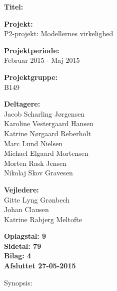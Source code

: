 \begin{minipage}[t]{0.48\textwidth}
\textbf{Titel:} \\[5pt]\bigskip\hspace{2ex}


\textbf{Projekt:} \\[5pt]\bigskip\hspace{2ex}
P2-projekt: Modellernes virkelighed

\textbf{Projektperiode:} \\[5pt]\bigskip\hspace{2ex}
Februar 2015 - Maj 2015

\textbf{Projektgruppe:} \\[5pt]\bigskip\hspace{2ex}
B149

\textbf{Deltagere:} \\[5pt]\hspace*{2ex}
Jacob Scharling Jørgensen \\\hspace*{2ex}
Karoline Vestergaard Hansen \\\hspace*{2ex}
Katrine Nørgaard Reberholt \\\hspace*{2ex}
Marc Lund Nielsen \\\hspace*{2ex}
Michael Elgaard Mortensen \\\hspace*{2ex}
Morten Rask Jensen \\\hspace*{2ex}
Nikolaj Skov Gravesen \\\bigskip\hspace{2ex}

\textbf{Vejledere:} \\[5pt]\hspace*{2ex}
Gitte Lyng Grønbech \\\hspace*{2ex}
Johan Clausen \\\hspace*{2ex}
Katrine Rabjerg Meltofte \\\bigskip\hspace{2ex}

\vspace*{0.5cm}

\textbf{Oplagstal: 9} \\
\textbf{Sidetal: 79} \\
\textbf{Bilag: 4} \\ 
\textbf{Afsluttet 27-05-2015}

\end{minipage}
\hfill
\begin{minipage}[t]{0.483\textwidth}
Synopsis: \\[5pt]
\fbox{\parbox{7cm}{\bigskip\bigskip}}
\end{minipage}

